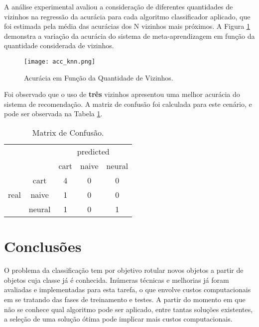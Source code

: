 \documentclass[runningheads]{llncs}
\begin{document}
A análise experimental avaliou a consideração de diferentes quantidades de vizinhos na regressão da acurácia para cada algoritmo classificador aplicado, que foi estimada pela média das acurácias dos N vizinhos mais próximos. A Figura \ref{acc} demonstra a variação da acurácia do sistema de meta-aprendizagem em função da quantidade considerada de vizinhos.

\begin{figure}[ht]
\texttt{[image: acc\_knn.png]}
\caption{Acurácia em Função da Quantidade de Vizinhos.} \label{acc}
\end{figure}

Foi observado que o uso de \textbf{três} vizinhos apresentou uma melhor acurácia do sistema de recomendação. A matriz de confusão foi calculada para este cenário, e pode ser observada na Tabela \ref{confusion_matrix}.

\begin{table}[ht]
\centering
\caption{Matrix de Confusão.}\label{confusion_matrix}
\begin{tabular}{cc|c|c|c|}
\cline{3-5}
                                            &        & \multicolumn{3}{c|}{predicted} \\ \cline{3-5}
                                            &        & cart    & naive    & neural    \\ \hline
\multicolumn{1}{|c|}{\multirow{3}{*}{real}} & cart   & 4       & 0        & 0         \\ \cline{2-5}
\multicolumn{1}{|c|}{}                      & naive  & 1       & 0        & 0         \\ \cline{2-5}
\multicolumn{1}{|c|}{}                      & neural & 1       & 0        & 1         \\ \hline
\end{tabular}
\end{table}

\section{Conclusões}

O problema da classificação tem por objetivo rotular novos objetos a partir de objetos cuja classe já é conhecida. Inúmeras técnicas e melhorias já foram avaliadas e implementadas para esta tarefa, o que envolve custos computacionais em se tratando das fases de treinamento e testes. A partir do momento em que não se conhece qual algoritmo pode ser aplicado, entre tantas soluções existentes, a seleção de uma solução ótima pode implicar mais custos computacionais.
\end{document}

